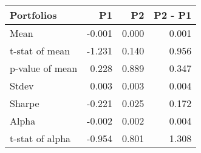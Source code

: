 \begin{tabular}{lrrr}
\toprule
Portfolios & P1 & P2 & P2 - P1 \\
\midrule
Mean & -0.001 & 0.000 & 0.001 \\
t-stat of mean & -1.231 & 0.140 & 0.956 \\
p-value of mean & 0.228 & 0.889 & 0.347 \\
Stdev & 0.003 & 0.003 & 0.004 \\
Sharpe & -0.221 & 0.025 & 0.172 \\
Alpha & -0.002 & 0.002 & 0.004 \\
t-stat of alpha & -0.954 & 0.801 & 1.308 \\
\bottomrule
\end{tabular}
